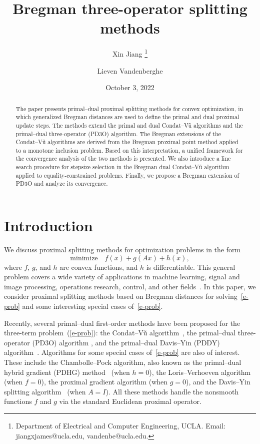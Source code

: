 \documentclass[letterpaper,11pt]{article}
\title{Bregman three-operator splitting methods}
\author{Xin Jiang%
\thanks{Department of Electrical and Computer Engineering, UCLA.
Email: \textsf{jiangxjames@ucla.edu}, \textsf{vandenbe@ucla.edu}.}
\and Lieven Vandenberghe\footnotemark[1]}
\date{October 3, 2022}
\begin{document}
\maketitle

\begin{abstract}
The paper presents primal--dual proximal splitting methods for
convex optimization, in which generalized Bregman distances are used
to define the primal and dual proximal update steps.
The methods extend the primal and dual Condat--V\~u algorithms
and the primal--dual three-operator (PD3O) algorithm.
The Bregman extensions of the Condat--V\~u algorithms 
are derived from the Bregman proximal point method applied to
a monotone inclusion problem.
Based on this interpretation, a unified framework for the convergence 
analysis of the two methods is presented.
We also introduce a line search procedure for stepsize selection
in the Bregman dual Condat--V\~u algorithm applied to 
equality-constrained problems.
Finally, we propose a Bregman extension of PD3O and analyze its 
convergence.
\end{abstract}


\section{Introduction}

We discuss proximal splitting methods for optimization problems 
in the form
\begin{equation} \label{e-prob}
  \mbox{minimize} \quad f(x) + g(Ax) + h(x),
\end{equation}
where $f$, $g$, and $h$ are convex functions, and $h$ is differentiable.
This general problem covers a wide variety of applications in 
machine learning, signal and image processing, operations research,
control, and other fields~\cite{CP11b,PaB:13,KP15,CP16b}.
In this paper, we consider proximal splitting methods based on Bregman 
distances for solving~\eqref{e-prob}
and some interesting special cases of~\eqref{e-prob}.

Recently, several primal--dual first-order methods have been proposed for 
the three-term problem~(\ref{e-prob}):
the Condat--V\~u algorithm~\cite{Con:13,Vu:13,YETA22},
the primal--dual three-operator (PD3O) algorithm \cite{Yan18}, and
the primal--dual Davis--Yin (PDDY) algorithm~\cite{SCMR20}.
Algorithms for some special cases of~\eqref{e-prob} are also of interest.
These include the Chambolle--Pock algorithm, also known as the
primal--dual hybrid gradient (PDHG) method~\cite{ChP:11,ChP:16} 
(when $h=0$),
the Loris--Verhoeven algorithm~\cite{LV11,CHZ13,DST15} (when $f=0$), 
the proximal gradient algorithm (when $g=0$), and
the Davis--Yin splitting algorithm~\cite{DY15} (when $A=I$).
All these methods handle the nonsmooth functions $f$ and $g$
via the standard Euclidean proximal operator.
 
\end{document}
